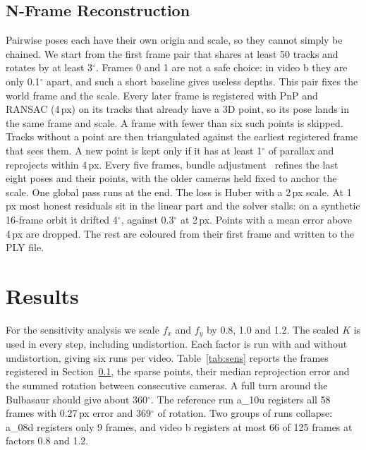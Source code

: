 \documentclass[conference]{assets/latex/IEEEtran}
\begin{document}
\subsection{N-Frame Reconstruction}\label{sec:nframe}
Pairwise poses each have their own origin and scale, so they cannot simply be
chained. We start from the first frame pair that shares at least 50 tracks and
rotates by at least 3$^\circ$. Frames 0 and 1 are not a safe choice: in video b
they are only 0.1$^\circ$ apart, and such a short baseline gives useless
depths. This pair fixes the world frame and the scale. Every later frame is
registered with PnP and RANSAC (4\,px) on its tracks that already have a 3D
point, so its pose lands in the same frame and scale. A frame with fewer than
six such points is skipped. Tracks without a point are then triangulated
against the earliest registered frame that sees them. A new point is kept only
if it has at least 1$^\circ$ of parallax and reprojects within 4\,px. Every
five frames, bundle adjustment~\cite{foundationsCVbook} refines the last eight
poses and their points, with the older cameras held fixed to anchor the scale.
One global pass runs at the end. The loss is Huber with a 2\,px scale. At 1\,px
most honest residuals sit in the linear part and the solver stalls: on a
synthetic 16-frame orbit it drifted 4$^\circ$, against 0.3$^\circ$ at 2\,px.
Points with a mean error above 4\,px are dropped. The rest are coloured from
their first frame and written to the PLY file.

\section{Results}
For the sensitivity analysis we scale $f_x$ and $f_y$ by 0.8, 1.0 and 1.2. The
scaled $K$ is used in every step, including undistortion. Each factor is run
with and without undistortion, giving six runs per video. Table~\ref{tab:sens}
reports the frames registered in Section~\ref{sec:nframe}, the sparse points,
their median reprojection error and the summed rotation between consecutive
cameras. A full turn around the Bulbasaur should give about 360$^\circ$. The
reference run a\_10u registers all 58 frames with 0.27\,px error and
369$^\circ$ of rotation. Two groups of runs collapse: a\_08d registers only 9
frames, and video b registers at most 66 of 125 frames at factors 0.8 and 1.2.
\end{document}
